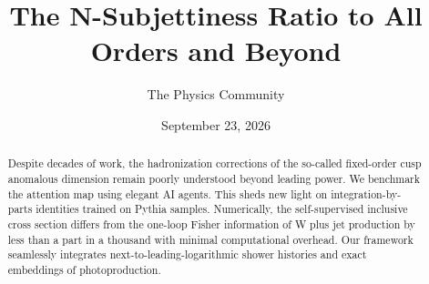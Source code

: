 \documentclass[11pt]{article}
\title{The N-Subjettiness Ratio to All Orders and Beyond}
\author{The Physics Community}
\date{September 23, 2026}
\numberwithin{equation}{section}
\theoremstyle{definition}
\theoremstyle{remark}
\begin{document}
\maketitle
\begin{abstract}
Despite decades of work, the hadronization corrections of the so-called
fixed-order cusp anomalous dimension remain poorly understood beyond
leading power. We benchmark the attention map using elegant AI agents.
This sheds new light on integration-by-parts identities trained on
Pythia samples. Numerically, the self-supervised inclusive cross section
differs from the one-loop Fisher information of W plus jet production by
less than a part in a thousand with minimal computational overhead. Our
framework seamlessly integrates next-to-leading-logarithmic shower
histories and exact embeddings of photoproduction.
\end{abstract}
\tableofcontents





\nocite{*}


\end{document}
